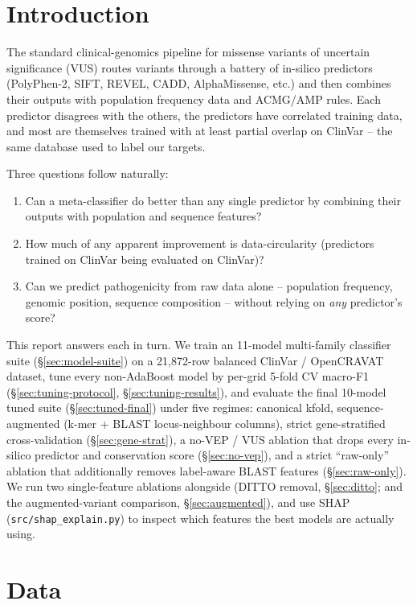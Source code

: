 \documentclass[11pt,a4paper]{article}
\begin{document}
\section{Introduction}

The standard clinical-genomics pipeline for missense variants of uncertain significance
(VUS) routes variants through a battery of in-silico predictors (PolyPhen-2, SIFT,
REVEL, CADD, AlphaMissense, etc.) and then combines their outputs with population
frequency data and ACMG/AMP rules. Each predictor disagrees with the others, the
predictors have correlated training data, and most are themselves trained with at
least partial overlap on ClinVar -- the same database used to label our targets.

Three questions follow naturally:
\begin{enumerate}[leftmargin=*]
    \item Can a meta-classifier do better than any single predictor by combining their
          outputs with population and sequence features?
    \item How much of any apparent improvement is data-circularity (predictors trained
          on ClinVar being evaluated on ClinVar)?
    \item Can we predict pathogenicity from raw data alone -- population frequency,
          genomic position, sequence composition -- without relying on \emph{any}
          predictor's score?
\end{enumerate}

This report answers each in turn. We train an 11-model multi-family classifier
suite (\S\ref{sec:model-suite}) on a 21{,}872-row balanced ClinVar / OpenCRAVAT
dataset, tune every non-AdaBoost model by per-grid 5-fold CV macro-F1
(\S\ref{sec:tuning-protocol}, \S\ref{sec:tuning-results}), and evaluate the
final 10-model tuned suite (\S\ref{sec:tuned-final}) under five regimes:
canonical kfold, sequence-augmented (k-mer + BLAST locus-neighbour columns),
strict gene-stratified cross-validation (\S\ref{sec:gene-strat}), a no-VEP /
VUS ablation that drops every in-silico predictor and conservation score
(\S\ref{sec:no-vep}), and a strict ``raw-only'' ablation that additionally
removes label-aware BLAST features (\S\ref{sec:raw-only}). We run two
single-feature ablations alongside (DITTO removal, \S\ref{sec:ditto}; and the
augmented-variant comparison, \S\ref{sec:augmented}), and use SHAP
(\texttt{src/shap\_explain.py}) to inspect which features the best models are
actually using.

\section{Data}
\end{document}
